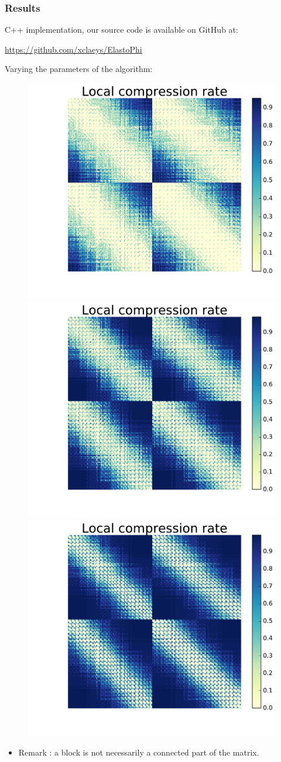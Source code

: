 
\begin{frame}
\frametitle{Results}

C++ implementation, our source code is available on GitHub at:
\begin{center}
\url{https://github.com/xclaeys/ElastoPhi}
\end{center}

Varying the parameters of the algorithm:
\vspace{-5pt}
\begin{figure}
\centering
\includegraphics[width=.33\textwidth]{../images/graphe_mapp_output_local_comp_1_0,9_matrice450Fracs.pdf}
\includegraphics[width=.33\textwidth]{../images/graphe_mapp_output_local_comp_10_0,9_matrice450Fracs.pdf}
\includegraphics[width=.33\textwidth]{../images/graphe_mapp_output_local_comp_10_1_matrice450Fracs.pdf}
\end{figure}
\begin{itemize}
\item Remark : a block is not necessarily a connected part of the matrix.
\end{itemize}
\end{frame}


